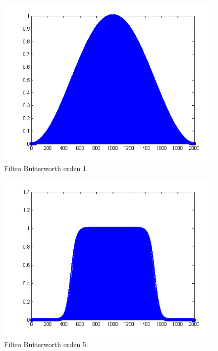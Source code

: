 \documentclass[10pt,a4paper,final]{article}
\begin{document}
\begin{figure}[h!]
\centering
  \caption{Filtro Butterworth orden 1.}
  \label{fig:res120}
  \includegraphics[scale=0.5]{fig9.png}
    
\end{figure}

\begin{figure}[h!]
\centering
  \caption{Filtro Butterworth orden 5.}
  \label{fig:res120}
  \includegraphics[scale=0.5]{fig10.png}
    
\end{figure}
\end{document}
